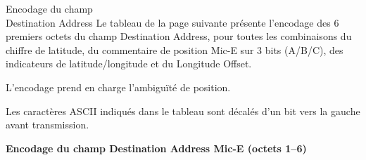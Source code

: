 \begin{aprssideblock}{Encodage du champ\\Destination Address}
Le tableau de la page suivante présente l'encodage des 6 premiers octets du
champ Destination Address, pour toutes les combinaisons du chiffre de latitude,
du commentaire de position Mic-E sur 3 bits (A/B/C), des indicateurs de
latitude/longitude et du Longitude Offset.

L'encodage prend en charge l'ambiguïté de position.

Les caractères ASCII indiqués dans le tableau sont décalés d'un bit vers la
gauche avant transmission.
\end{aprssideblock}

\begin{center}
\sffamily\bfseries Encodage du champ Destination Address Mic-E (octets 1--6)


\end{center}
